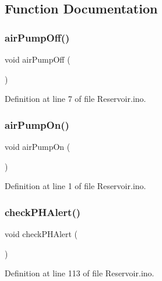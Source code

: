 \subsection{Function Documentation}
\mbox{\label{_reservoir_8ino_a9d7fc50335a0dfc970349fe10e10729f}} 
\subsubsection{\texorpdfstring{airPumpOff()}{airPumpOff()}}
{\footnotesize\ttfamily void air\+Pump\+Off (\begin{DoxyParamCaption}{ }\end{DoxyParamCaption})}



Definition at line 7 of file Reservoir.\+ino.

\mbox{\label{_reservoir_8ino_abaf5b082db42708d31242604cb3949bc}} 
\subsubsection{\texorpdfstring{airPumpOn()}{airPumpOn()}}
{\footnotesize\ttfamily void air\+Pump\+On (\begin{DoxyParamCaption}{ }\end{DoxyParamCaption})}



Definition at line 1 of file Reservoir.\+ino.

\mbox{\label{_reservoir_8ino_a5f2df42c76b74fa92dc5a734984c5f72}} 
\subsubsection{\texorpdfstring{checkPHAlert()}{checkPHAlert()}}
{\footnotesize\ttfamily void check\+P\+H\+Alert (\begin{DoxyParamCaption}{ }\end{DoxyParamCaption})}



Definition at line 113 of file Reservoir.\+ino.


